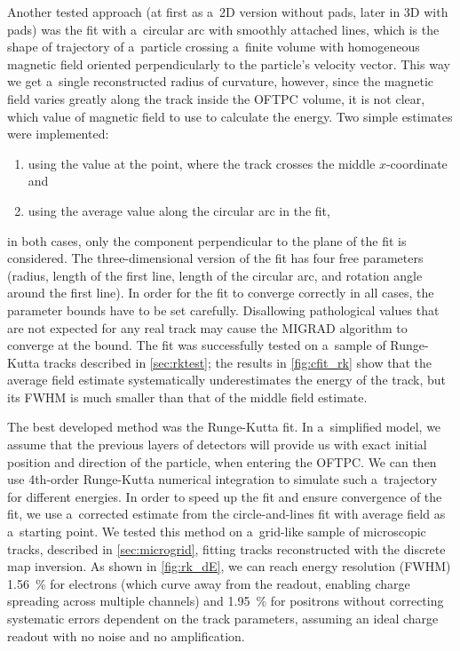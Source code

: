 		Another tested approach (at first as a~2D version without pads, later in 3D with pads) was the fit with a~circular arc with smoothly attached lines, which is the shape of trajectory of a~particle crossing a~finite volume with homogeneous magnetic field oriented perpendicularly to the particle's velocity vector. This way we get a~single reconstructed radius of curvature, however, since the magnetic field varies greatly along the track inside the \ac{OFTPC} volume, it is not clear, which value of magnetic field to use to calculate the energy. Two simple estimates were implemented:
		\begin{enumerate}[nosep]
			\item using the value at the point, where the track crosses the middle $x$\nobreakdash-coordinate and
			\item using the average value along the circular arc in the fit,
		\end{enumerate}
		in both cases, only the component perpendicular to the plane of the fit is considered. The three-dimensional version of the fit has four free parameters (radius, length of the first line, length of the circular arc, and rotation angle around the first line). In order for the fit to converge correctly in all cases, the parameter bounds have to be set carefully. Disallowing pathological values that are not expected for any real track may cause the MIGRAD algorithm to converge at the bound. The fit was successfully tested on a~sample of Runge-Kutta tracks described in \cref{sec:rktest}; the results in \cref{fig:cfit_rk} show that the average field estimate systematically underestimates the energy of the track, but its \acs{FWHM} is much smaller than that of the middle field estimate.
		
		The best developed method was the Runge-Kutta fit. In a~simplified model, we assume that the previous layers of detectors will provide us with exact initial position and direction of the particle, when entering the \ac{OFTPC}. We can then use 4th\nobreakdash-order Runge-Kutta numerical integration to simulate such a~trajectory for different energies. In order to speed up the fit and ensure convergence of the fit, we use a~corrected estimate from the circle-and-lines fit with average field as a~starting point. We tested this method on a~grid-like sample of microscopic tracks, described in \cref{sec:microgrid}, fitting tracks reconstructed with the discrete map inversion. As shown in \cref{fig:rk_dE}, we can reach energy resolution (\acs{FWHM}) \qty{1.56}{\percent} for electrons (which curve away from the readout, enabling charge spreading across multiple channels) and \qty{1.95}{\percent} for positrons without correcting systematic errors dependent on the track parameters, assuming an ideal charge readout with no noise and no amplification.
		
